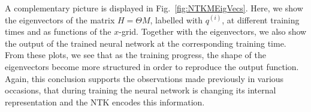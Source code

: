 A complementary picture is displayed in Fig.~\ref{fig:NTKMEigVecs}. Here, we
show the eigenvectors of the matrix $H = \Theta M$, labelled with $q^{(i)}$, at
different training times and as functions of the $x$-grid. Together with the
eigenvectors, we also show the output of the trained neural network at the
corresponding training time. From these plots, we see that as the training
progress, the shape of the eigenvectors become more structured in order to
reproduce the output function. Again, this conclusion supports the observations
made previously in various occasions, that during training the neural network is
changing its internal representation and the NTK encodes this information.

\FloatBarrier
